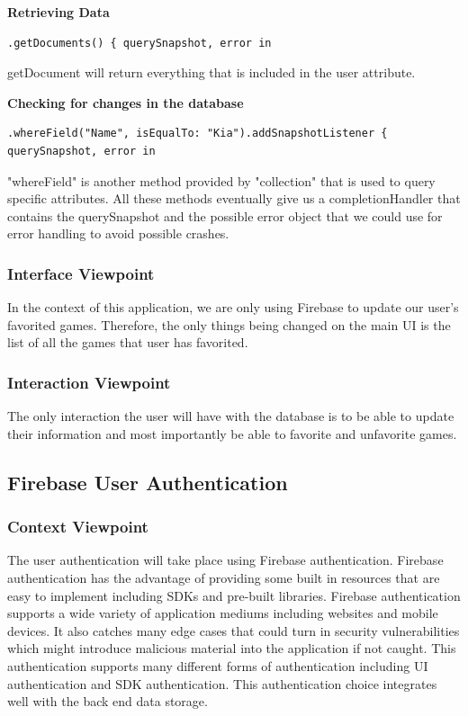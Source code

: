 \documentclass[onecolumn, draftclsnofoot,10pt, compsoc]{IEEEtran}
\begin{document}
\noindent\textbf{Retrieving Data}
\begin{lstlisting}
.getDocuments() { querySnapshot, error in 
\end{lstlisting}
getDocument will return everything that is included in the user attribute. 

\noindent\textbf{Checking for changes in the database}
\begin{lstlisting}
.whereField("Name", isEqualTo: "Kia").addSnapshotListener { querySnapshot, error in 
\end{lstlisting}

\noindent "whereField" is another method provided by "collection" that is used to query specific attributes. All these methods eventually give us a completionHandler that contains the querySnapshot and the possible error object that we could use for error handling to avoid possible crashes.
\subsubsection{Interface Viewpoint}
In the context of this application, we are only using Firebase to update our user's favorited games. Therefore, the only things being changed on the main UI is the list of all the games that user has favorited. 
\subsubsection{Interaction Viewpoint}
The only interaction the user will have with the database is to be able to update their information and most importantly be able to favorite and unfavorite games.
\subsection{Firebase User Authentication}
\subsubsection{Context Viewpoint}
The user authentication will take place using Firebase authentication. Firebase authentication has the advantage of providing some built in resources that are easy to implement including SDKs and pre-built libraries. Firebase authentication supports a wide variety of application mediums including websites and mobile devices. It also catches many edge cases that could turn in security vulnerabilities which might introduce malicious material into the application if not caught. This authentication  supports many different forms of authentication including UI authentication and SDK authentication. This authentication choice integrates well with the back end data storage.
\end{document}
